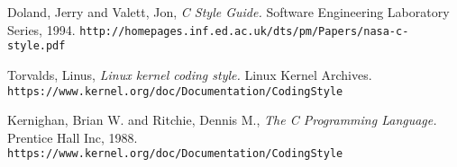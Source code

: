\documentclass[11pt]{article}
\begin{document}

\begin{thebibliography}{99} 
	\label{references}
	
	 Doland, Jerry and Valett, Jon, {\em C Style Guide.} Software Engineering Laboratory Series, 1994. \texttt{http://homepages.inf.ed.ac.uk/dts/pm/Papers/nasa-c-style.pdf}
	
	 Torvalds, Linus, {\em Linux kernel coding style.} Linux Kernel Archives. \texttt{https://www.kernel.org/doc/Documentation/CodingStyle}
	
	 Kernighan, Brian W. and Ritchie, Dennis M., {\em The C Programming Language.} Prentice Hall Inc, 1988. \texttt{https://www.kernel.org/doc/Documentation/CodingStyle}
	
\end{thebibliography}
\end{document}
